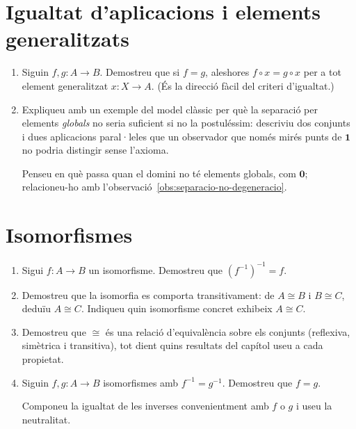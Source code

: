 \section{Igualtat d'aplicacions i elements generalitzats}

\begin{enumerate}[resume]
  \item Siguin \(f,g\colon A\to B\). Demostreu que si \(f=g\), aleshores \(f\circ x=g\circ x\) per a tot element generalitzat \(x\colon X\to A\). (És la direcció fàcil del criteri d'igualtat.)

  \item Expliqueu amb un exemple del model clàssic per què la separació per elements \emph{globals} no seria suficient si no la postuléssim: descriviu dos conjunts i dues aplicacions paral·leles que un observador que només mirés punts de \(\mathbf1\) no podria distingir sense l'axioma. \begin{indicacio}Penseu en què passa quan el domini no té elements globals, com \(\mathbf0\); relacioneu-ho amb l'observació~\ref{obs:separacio-no-degeneracio}.\end{indicacio}
\end{enumerate}

\section{Isomorfismes}

\begin{enumerate}[resume]
  \item Sigui \(f\colon A\to B\) un isomorfisme. Demostreu que \({(f^{-1})}^{-1}=f\).

  \item Demostreu que la isomorfia es comporta transitivament: de \(A\cong B\) i \(B\cong C\), deduïu \(A\cong C\). Indiqueu quin isomorfisme concret exhibeix \(A\cong C\).

  \item Demostreu que \(\cong\) és una relació d'equivalència sobre els conjunts (reflexiva, simètrica i transitiva), tot dient quins resultats del capítol useu a cada propietat.

  \item Siguin \(f,g\colon A\to B\) isomorfismes amb \(f^{-1}=g^{-1}\). Demostreu que \(f=g\). \begin{indicacio}Componeu la igualtat de les inverses convenientment amb \(f\) o \(g\) i useu la neutralitat.\end{indicacio}
\end{enumerate}

